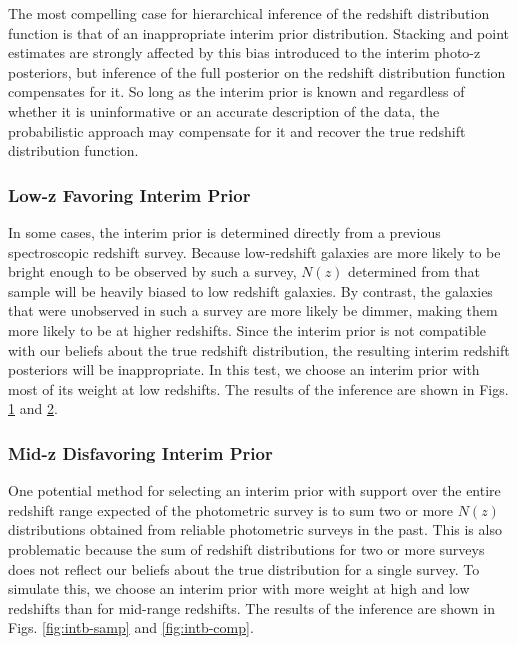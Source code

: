 \documentclass[preprint]{aastex}
\begin{document}
The most compelling case for hierarchical inference of the redshift 
distribution function is that of an inappropriate interim prior distribution.  
Stacking and point estimates are strongly affected by this bias introduced to 
the interim photo-z posteriors, but inference of the full posterior on the 
redshift distribution function compensates for it.  So long as the interim 
prior is known and regardless of whether it is uninformative or an accurate 
description of the data, the probabilistic approach may compensate for it and 
recover the true redshift distribution function.

\subsubsection{Low-z Favoring Interim Prior}
\label{sec:lowz}

In some cases, the interim prior is determined directly from a previous 
spectroscopic redshift survey.  Because low-redshift galaxies are more likely 
to be bright enough to be observed by such a survey, $N(z)$ determined from 
that sample will be heavily biased to low redshift galaxies.  By contrast, the 
galaxies that were unobserved in such a survey are more likely be dimmer, 
making them more likely to be at higher redshifts.  Since the interim prior is 
not compatible with our beliefs about the true redshift distribution, the 
resulting interim redshift posteriors will be inappropriate.  In this test, we 
choose an interim prior with most of its weight at low redshifts.  The results 
of the inference are shown in Figs. \ref{fig:intu-samp} and \ref{fig:intu-comp}.

\begin{figure}
\caption{}
\label{fig:intu-samp}
\end{figure}

\begin{figure}
\caption{}
\label{fig:intu-comp}
\end{figure}

\subsubsection{Mid-z Disfavoring Interim Prior}
\label{sec:midz}

One potential method for selecting an interim prior with support over the 
entire redshift range expected of the photometric survey is to sum two or more 
$N(z)$ distributions obtained from reliable photometric surveys in the past.  
This is also problematic because the sum of redshift distributions for two or 
more surveys does not reflect our beliefs about the true distribution for a 
single survey.  To simulate this, we choose an interim prior with more weight 
at high and low redshifts than for mid-range redshifts.  The results of the 
inference are shown in Figs. \ref{fig:intb-samp} and \ref{fig:intb-comp}.
\end{document}
